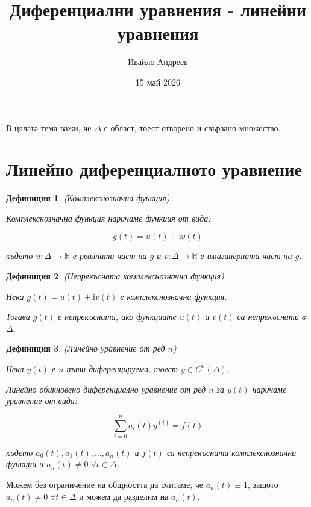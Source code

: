 \documentclass{scrartcl}
\title{Диференциални уравнения - линейни уравнения}
\author{Ивайло Андреев}
\date{15 май 2026}
\newtheorem{definition}{Дефиниция}
\begin{document}
\maketitle

\tableofcontents

\newpage

\begin{FlushLeft}

В цялата тема важи, че $\Delta$ е област, тоест отворено и свързано множество.

\section{Линейно диференциалното уравнение}

\begin{definition}
(Комплекснозначна функция)

Комплекснозначна функция наричаме функция от вида:

$$g(t) = u(t) + \mathrm{i}v(t)$$

където $u: \Delta \rightarrow \mathbb{R}$ е реалната част на $g$ и $v: \Delta \rightarrow \mathbb{R}$ е имагинерната част на $g$.
\end{definition}

\begin{definition}
(Непрекъсната комплекснозначна функция)

Нека $g(t) = u(t) + \mathrm{i}v(t)$ е комплекснозначна функция.

Тогава $g(t)$ е непрекъсната, ако функциите $u(t)$ и $v(t)$ са непрекъснати в $\Delta$.
\end{definition}

\begin{definition}
(Линейно уравнение от ред $n$)

Нека $y(t)$ е $n$ пъти диференцируема, тоест $y \in C^n(\Delta)$.

Линейно обикновено диференциално уравнение от ред $n$ за $y(t)$ наричаме уравнение от вида:

\begin{equation}\label{eq:general_linear}
    \sum_{i=0}^n a_i(t)y^{(i)} = f(t)
\end{equation}

където $a_0(t), a_1(t), \dots, a_n(t)$ и $f(t)$ са непрекъснати комплекснозначни функции и $a_n(t) \ne 0 \; \forall t \in \Delta$.
\end{definition}

Можем без ограничение на общността да считаме, че $a_n(t) \equiv 1$, защото $a_n(t) \ne 0 \; \forall t \in \Delta$ и можем да разделим на $a_n(t)$.


\end{FlushLeft}
\end{document}
